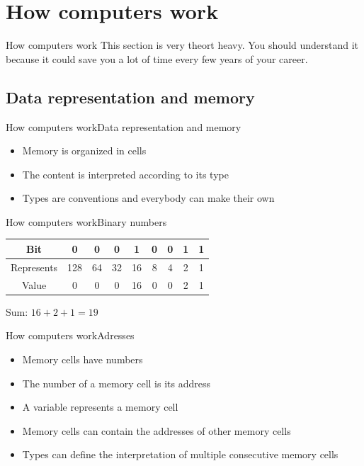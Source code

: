\documentclass[aspectratio=169]{beamer}
\begin{document}
\section{How computers work}
\begin{frame}{How computers work}
	This section is very theort heavy.
	You should understand it because it could save you a lot of time every few years of your career.
\end{frame}

\subsection{Data representation and memory}
\begin{frame}{How computers work}{Data representation and memory}
\begin{itemize}
	\item Memory is organized in cells
	\item The content is interpreted according to its type
	\item Types are conventions and everybody can make their own
\end{itemize}
\end{frame}

\begin{frame}{How computers work}{Binary numbers}

\begin{tabular}{c|cccccccc}
	Bit        & 0   & 0  & 0  & 1  & 0 & 0 & 1 & 1 
	\pause
	\\ \hline
	Represents & 128 & 64 & 32 & 16 & 8 & 4 & 2 & 1 \\ 
	Value      & 0   & 0  & 0  & 16 & 0 & 0 & 2 & 1 \\
\end{tabular}
\pause
\vspace{2em}

Sum:
\begin{math}
	16 + 2 + 1 = 19
\end{math}
\end{frame}

\begin{frame}{How computers work}{Adresses}
\begin{itemize}
	\item Memory cells have numbers
	\item The number of a memory cell is its address
	\item A variable represents a memory cell
	\pause
	\item Memory cells can contain the addresses of other memory cells
	\item Types can define the interpretation of multiple consecutive memory cells
\end{itemize}
\end{frame}
\end{document}
